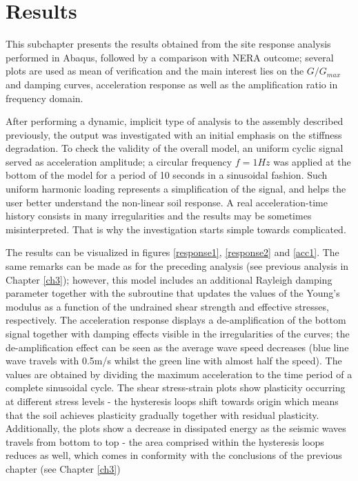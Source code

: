 	\section{Results}
	This subchapter presents the results obtained from the site response analysis performed in Abaqus, followed by a comparison with NERA outcome; several plots are used as mean of verification and the main interest lies on the $G/G_{max}$ and damping curves, acceleration response as well as the amplification ratio in frequency domain.
	
	After performing a dynamic, implicit type of analysis to the assembly described previously, the output was investigated with an initial emphasis on the stiffness degradation. To check the validity of the overall model, an uniform cyclic signal served as acceleration amplitude; a circular frequency $f=1 Hz$ was applied at the bottom of the model for a period of 10 seconds in a sinusoidal fashion. Such uniform harmonic loading represents a simplification of the signal, and helps the user better understand the non-linear soil response. A real acceleration-time history consists in many irregularities and the results may be sometimes misinterpreted. That is why the investigation starts simple towards complicated.
	
	The results can be visualized in figures \ref{response1}, \ref{response2} and \ref{acc1}. The same remarks can be made as for the preceding analysis (see previous analysis in Chapter \ref{ch3}); however, this model includes an additional Rayleigh damping parameter together with the subroutine that updates the values of the Young's modulus as a function of the undrained shear strength and effective stresses, respectively. The acceleration response displays a de-amplification of the bottom signal together with damping effects visible in the irregularities of the curves; the de-amplification effect can be seen as the average wave speed decreases (blue line wave travels with 0.5m/s whilst the green line with almost half the speed). The values are obtained by dividing the maximum acceleration to the time period of a complete sinusoidal cycle. The shear stress-strain plots show plasticity occurring at different stress levels - the hysteresis loops shift towards origin which means that the soil achieves plasticity gradually together with residual plasticity. Additionally, the plots show a decrease in dissipated energy as the seismic waves travels from bottom to top - the area comprised within the hysteresis loops reduces as well, which comes in conformity with the conclusions of the previous chapter (see Chapter \ref{ch3})
	
